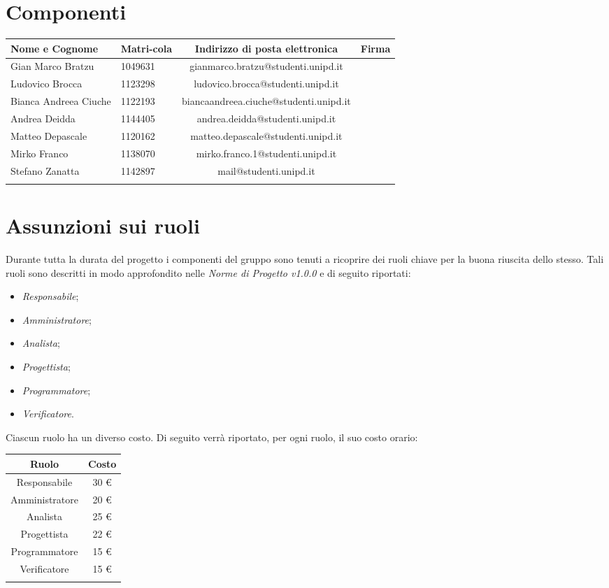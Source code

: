 \section{Componenti}

		\begin{tabularx}{\textwidth}{|X|X|c|X|}
			\hline
			\textbf{Nome e Cognome} &\textbf{Matri-}\newline \textbf{cola} & \textbf{Indirizzo di posta elettronica} & \textbf{Firma} \\
			\hline 
			Gian Marco Bratzu & 1049631 &gianmarco.bratzu@studenti.unipd.it & \\
			\hline
			Ludovico Brocca & 1123298 & ludovico.brocca@studenti.unipd.it & \\
			\hline
			Bianca Andreea Ciuche & 1122193 & biancaandreea.ciuche@studenti.unipd.it & \\
			\hline
			Andrea Deidda & 1144405 & andrea.deidda@studenti.unipd.it & \\
			\hline
			Matteo Depascale & 1120162 & matteo.depascale@studenti.unipd.it & \\
			\hline
			Mirko Franco & 1138070 &  mirko.franco.1@studenti.unipd.it & \\
			\hline
			Stefano Zanatta & 1142897 & mail@studenti.unipd.it & \\
			\hline
			\caption{Componenti}
		\end{tabularx}
			

\section{Assunzioni sui ruoli}
	Durante tutta la durata del progetto i componenti del gruppo sono tenuti a ricoprire dei ruoli chiave per la buona riuscita dello stesso.
	Tali ruoli sono descritti in modo approfondito nelle \textit{Norme di Progetto v1.0.0} e di seguito riportati:
	\begin{itemize}
		\item \textit{Responsabile};
		\item \textit{Amministratore};
		\item \textit{Analista};
		\item \textit{Progettista};
		\item \textit{Programmatore};
		\item \textit{Verificatore}.
	\end{itemize}
	Ciascun ruolo ha un diverso costo. Di seguito verrà riportato, per ogni ruolo, il suo costo orario:

		\begin{tabularx}{\textwidth}{|c|c|}
			\hline
			\textbf{Ruolo} & \textbf{Costo} \\
			\hline
			Responsabile & 30 \euro \\
			Amministratore & 20 \euro \\
			Analista & 25 \euro \\
			Progettista & 22 \euro \\
			Programmatore & 15 \euro \\
			Verificatore & 15 \euro \\
			\hline
			\caption{Costi per ruolo}
		\end{tabularx}
